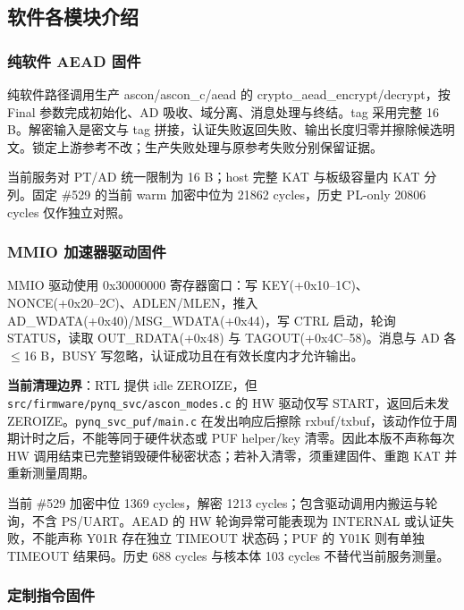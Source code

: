 \subsection{软件各模块介绍}

\Needspace{85pt}

\subsubsection{纯软件 AEAD 固件}\label{ux7eafux8f6fux4ef6-aead-ux56faux4ef6}

纯软件路径调用生产 ascon/ascon\_c/aead 的 crypto\_aead\_encrypt/decrypt，按 Final 参数完成初始化、AD 吸收、域分离、消息处理与终结。tag 采用完整 16 B。解密输入是密文与 tag 拼接，认证失败返回失败、输出长度归零并擦除候选明文。锁定上游参考不改；生产失败处理与原参考失败分别保留证据。

当前服务对 PT/AD 统一限制为 16 B；host 完整 KAT 与板级容量内 KAT 分列。固定 \#529 的当前 warm 加密中位为 21862 cycles，历史 PL-only 20806 cycles 仅作独立对照。

\Needspace{85pt}

\subsubsection{MMIO 加速器驱动固件}\label{mmio-ux52a0ux901fux5668ux9a71ux52a8ux56faux4ef6}

MMIO 驱动使用 0x30000000 寄存器窗口：写 KEY(+0x10--1C)、NONCE(+0x20--2C)、ADLEN/MLEN，推入 AD\_WDATA(+0x40)/MSG\_WDATA(+0x44)，写 CTRL 启动，轮询 STATUS，读取 OUT\_RDATA(+0x48) 与 TAGOUT(+0x4C--58)。消息与 AD 各 $\leq$16 B，BUSY 写忽略，认证成功且在有效长度内才允许输出。

\textbf{当前清理边界}：RTL 提供 idle ZEROIZE，但 \texttt{src/firmware/pynq\_svc/ascon\_modes.c} 的 HW 驱动仅写 START，返回后未发 ZEROIZE。\texttt{pynq\_svc\_puf/main.c} 在发出响应后擦除 rxbuf/txbuf，该动作位于周期计时之后，不能等同于硬件状态或 PUF helper/key 清零。因此本版不声称每次 HW 调用结束已完整销毁硬件秘密状态；若补入清零，须重建固件、重跑 KAT 并重新测量周期。

当前 \#529 加密中位 1369 cycles，解密 1213 cycles；包含驱动调用内搬运与轮询，不含 PS/UART。AEAD 的 HW 轮询异常可能表现为 INTERNAL 或认证失败，不能声称 Y01R 存在独立 TIMEOUT 状态码；PUF 的 Y01K 则有单独 TIMEOUT 结果码。历史 688 cycles 与核本体 103 cycles 不替代当前服务测量。

\Needspace{85pt}

\subsubsection{定制指令固件}

